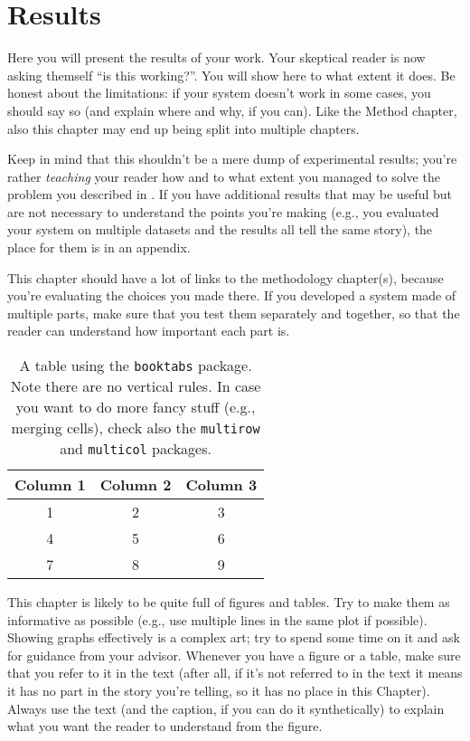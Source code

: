 \chapter{Results}
\label{sec:results}

Here you will present the results of your work. Your skeptical reader is now asking themself
``is this working?''. You will show here to what extent it does. Be honest about the limitations:
if your system doesn't work in some cases, you should say so (and explain where and why, if you
can). Like the Method chapter, also this chapter may end up being split into multiple chapters.

Keep in mind that this shouldn't be a mere dump of experimental results; you're rather
\emph{teaching} your reader how and to what extent you managed to solve the problem you
described in . If you have additional results that may be useful
but are not necessary to understand the points you're making (e.g., you evaluated your system
on multiple datasets and the results all tell the same story), the place for them is in an
appendix.

This chapter should have a lot of links to the methodology chapter(s), because you're
evaluating the choices you made there. If you developed a system made of multiple parts,
make sure that you test them separately and together, so that the reader can understand how
important each part is.

\begin{table}
    \centering
    \begin{tabular}{ccc}
        \toprule
        \textbf{Column 1} & \textbf{Column 2} & \textbf{Column 3} \\
        \midrule
        1 & 2 & 3 \\
        4 & 5 & 6 \\
        7 & 8 & 9 \\
        \bottomrule
    \end{tabular}
    \caption{A table using the \latex \texttt{booktabs} package. Note there are no vertical
    rules. In case you want to do more fancy stuff (e.g., merging cells), check also the
    \texttt{multirow} and \texttt{multicol} packages.}
    \label{tab:table}
\end{table}

This chapter is likely to be quite full of figures and tables. Try to make them as informative
as possible (e.g., use multiple lines in the same plot if possible). Showing graphs
effectively is a complex art; try to spend some time on it and ask for guidance from your
advisor. Whenever you have a figure or a table, make sure that you refer to it in the text
(after all, if it's not referred to in the text it means it has no part in the story you're
telling, so it has no place in this Chapter). Always use the text (and the caption, if you can
do it synthetically) to explain what you want the reader to understand from the figure.

